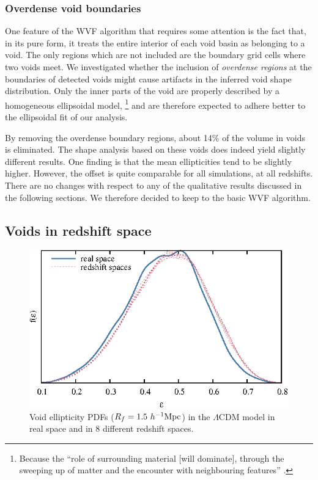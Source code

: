 \subsubsection{Overdense void boundaries}
One feature of the WVF algorithm that requires some attention is the fact that, in its pure form, it treats 
the entire interior of each void basin as belonging to a void. The only regions which are not included are 
the boundary grid cells where two voids meet. We investigated whether the inclusion of \textit{overdense regions} 
at the boundaries of detected voids might cause artifacts in the inferred void shape distribution. Only the inner 
parts of the void are properly described by a homogeneous ellipsoidal model, 
\footnote{Because the ``role of surrounding material [will dominate], through the sweeping up of matter and the encounter 
with neighbouring features'' \citep{weygaert11}.} and are therefore expected to adhere better to the ellipsoidal fit of 
our analysis. 

By removing the overdense boundary regions, about 14\% of the volume in voids is eliminated. The shape analysis based 
on these voids does indeed yield slightly different results. One finding is that the mean ellipticities tend to 
be slightly higher. However, the offset is quite comparable for all simulations, at all redshifts. There are no changes 
with respect to any of the qualitative results discussed in the following sections. We therefore decided to keep to the 
basic WVF algorithm.

\subsection{Voids in redshift space}

\begin{figure}
	\includegraphics[width=\textwidth]{ch_voidsde/img/ell_zspaces}
	\caption{Void ellipticity PDFs ($R_f = 1.5 ~h^{-1} {\rm Mpc}$) in the $\Lambda$CDM model in real space and in 8 different redshift spaces.}
	\label{fig:ell_zspaces}
\end{figure}

